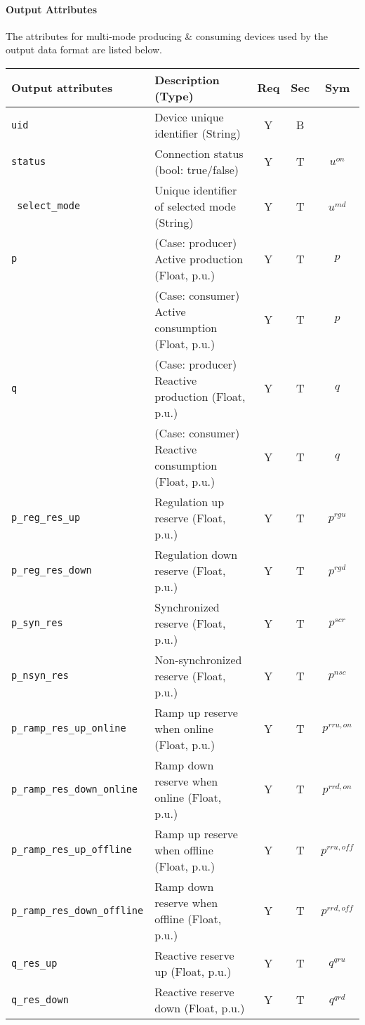 \documentclass{article}
\begin{document}
\paragraph{Output Attributes} The attributes for multi-mode producing \& consuming devices 
used by the output data format are listed below.
\begin{center}
\small
\begin{tabular}{ l | l | c | c | c |}
Output attributes & Description (Type) & Req & Sec & Sym\\
\hline
  {\tt uid} & Device unique identifier (String) & Y & B & \\
  {\tt status}     & Connection status (bool: true/false) & Y & T & $u^{on}$ \\ 
  {\tt\color{red} select\_mode}  & Unique identifier of selected mode (String)& Y & T & $u^{md}$\\      
  {\tt p} & { (Case: producer) Active production (Float, p.u.) } & Y & T & $p$ \\
          & { (Case: consumer) Active consumption (Float, p.u.) } & Y & T & $p$ \\
  {\tt q} & { (Case: producer) Reactive production (Float, p.u.)}& Y & T & $q$ \\
          & { (Case: consumer) Reactive consumption (Float, p.u.)}& Y & T & $q$ \\
  {\tt p\_reg\_res\_up} & Regulation up reserve (Float, p.u.) & Y & T & $p^{rgu}$\\
  {\tt p\_reg\_res\_down} & Regulation down reserve (Float, p.u.) & Y & T & $p^{rgd}$\\ 
  {\tt p\_syn\_res} & Synchronized reserve (Float, p.u.) & Y & T &{ $p^{scr}$}\\ 
  {\tt p\_nsyn\_res} & Non-synchronized reserve (Float, p.u.) & Y & T &{ $p^{nsc}$}\\     
  {\tt p\_ramp\_res\_up\_online}    & Ramp up reserve when online (Float, p.u.) & Y & T & $p^{rru, on}$\\   
  {\tt p\_ramp\_res\_down\_online}  & Ramp down reserve when online (Float, p.u.) & Y & T & $p^{rrd, on}$\\   
  {\tt p\_ramp\_res\_up\_offline}   & Ramp up reserve when offline (Float, p.u.) & Y & T & $p^{rru, off}$\\   
  {\tt p\_ramp\_res\_down\_offline} & Ramp down reserve when offline (Float, p.u.) & Y & T & $p^{rrd, off}$\\
  {\tt q\_res\_up}   & Reactive reserve up (Float, p.u.) & Y & T & $q^{qru}$\\ 
  {\tt q\_res\_down} & Reactive reserve down (Float, p.u.) & Y & T & $q^{qrd}$\\     
  \hline
\end{tabular}
\end{center}
\end{document}
